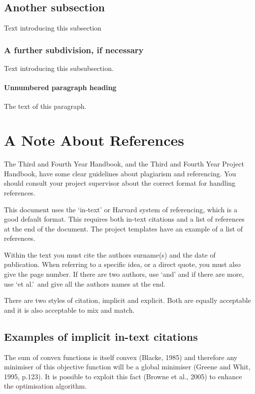\documentclass[a4paper, 12pt, notitlepage]{report}
\begin{document}
\subsection{Another subsection}
%
Text introducing this subsection

\subsubsection{A further subdivision, if necessary}
%
Text introducing this subsubsection.

\paragraph{Unnumbered paragraph heading}
The text of this paragraph.

\section{A Note About References}
%
The Third and Fourth Year Handbook, and the Third and Fourth Year Project Handbook, have some clear guidelines about plagiarism and referencing.
You should consult your project supervisor about the correct format for handling references.

This document uses the `in-text' or Harvard system of referencing, which is a good default format.
This requires both in-text citations and a list of references at the end of the document.
The project templates have an example of a list of references.

Within the text you must cite the authors surname(s) and the date of publication.
When referring to a specific idea, or a direct quote, you must also give the page number.
If there are two authors, use `and' and if there are more, use `et al.'\ and give all the authors names at the end.

There are two styles of citation, implicit and explicit.
Both are equally acceptable and it is also acceptable to mix and match.

\subsection{Examples of implicit in-text citations}
%
The sum of convex functions is itself convex (Blacke, 1985) and therefore any minimiser of this objective function will be a global minimiser (Greene and Whit, 1995, p.123). It is possible to exploit this fact (Browne et al., 2005) to enhance the optimisation algorithm.
\end{document}
